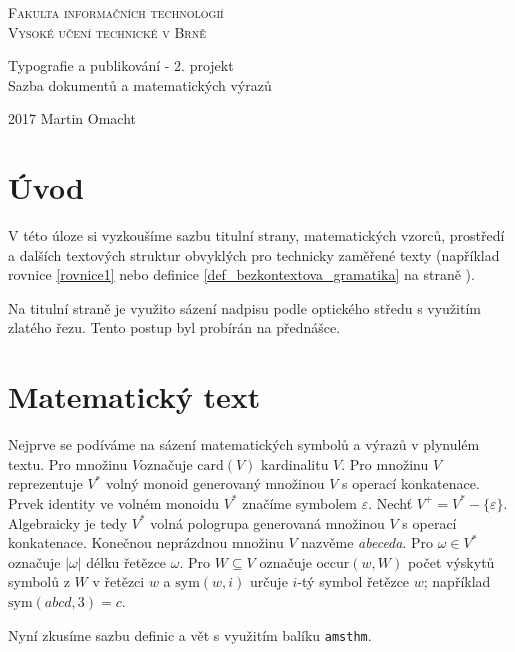 \documentclass[11pt, a4paper, twocolumn]{article}
\theoremstyle{definition}
\theoremstyle{plain}
\begin{document}
	\begin{titlepage}
		\begin{center}
			{\linespread{0.75}
				\Huge
				\textsc{Fakulta informačních technologií\\ Vysoké učení technické v Brně}
			}

			{\linespread{0.8}
				\LARGE
				Typografie a publikování - 2. projekt\\
				Sazba dokumentů a matematických výrazů
			}
		\end{center}		
		{\Large 2017 \hfill Martin Omacht}
	\end{titlepage}

	\section*{Úvod} %
	\label{sec:úvod}
	V této úloze si vyzkoušíme sazbu titulní strany, matematických vzorců, prostředí a dalších textových struktur obvyklých pro technicky zaměřené texty (například rovnice \eqref{rovnice1} nebo definice \ref{def_bezkontextova_gramatika} na straně \pageref{def_bezkontextova_gramatika}).

	Na titulní straně je využito sázení nadpisu podle optického středu s využitím zlatého řezu. Tento postup byl probírán na přednášce.

	\section{Matematický text} %
	\label{sec:matematický_text}
	Nejprve se podíváme na sázení matematických symbolů a výrazů v plynulém textu. Pro množinu $V$označuje $\mathrm{card}(V)$ kardinalitu $V$.
	Pro množinu $V$ reprezentuje $V^\ast$ volný monoid generovaný množinou $V$ s operací konkatenace.
	Prvek identity ve volném monoidu $V^*$ značíme symbolem $\varepsilon$.
	Nechť $V^+ = V^\ast - \{\varepsilon\}$. Algebraicky je tedy $V^\ast$ volná pologrupa generovaná množinou $V$ s operací konkatenace.
	Konečnou neprázdnou množinu $V$ nazvěme \emph{abeceda}.
	Pro $\omega \in V^\ast$ označuje $|\omega|$ délku řetězce $\omega$. Pro $W \subseteq V$ označuje $\mathrm{occur}(w,W)$ počet výskytů symbolů z $W$ v řetězci $w$ a $\mathrm{sym}(w,i)$ určuje $i$-tý symbol řetězce $w$; například $\mathrm{sym}(abcd,3)=c$.

	Nyní zkusíme sazbu definic a vět s využitím balíku \texttt{amsthm}.
\end{document}
